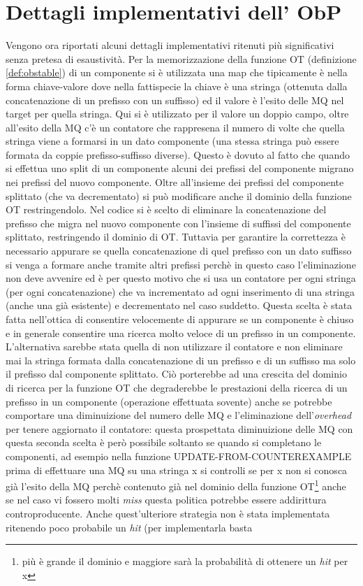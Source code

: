 \section[Dett. impl. ObP]{Dettagli implementativi dell' ObP}
\label{sec:implobp} 
Vengono ora riportati alcuni dettagli implementativi ritenuti più significativi senza pretesa di esaustività.
Per la memorizzazione della funzione OT (definizione \ref{def:obstable}) di un componente si è utilizzata una map che tipicamente è nella forma chiave-valore dove nella fattispecie la chiave è una stringa (ottenuta dalla concatenazione di un prefisso con un suffisso) ed il valore è l'esito delle \ac{MQ} nel target per quella stringa. Qui si è utilizzato per il valore un doppio campo, oltre all'esito della \ac{MQ} c'è un contatore che rappresena il numero di volte che quella stringa viene a formarsi in un dato componente (una stessa stringa può essere formata da  coppie prefisso-suffisso diverse). Questo è dovuto al fatto che quando si effettua uno split di un componente alcuni dei prefissi del componente migrano nei prefissi del nuovo componente. Oltre all'insieme dei prefissi del componente splittato (che va decrementato) si può modificare anche il dominio della funzione OT restringendolo. Nel codice si è scelto di eliminare la concatenazione del prefisso che migra nel nuovo componente con l'insieme di suffissi del componente splittato, restringendo il dominio di OT. Tuttavia per garantire la correttezza è necessario appurare se quella concatenazione di quel prefisso con un dato suffisso si venga a formare anche tramite altri prefissi perchè in questo caso l'eliminazione non deve avvenire ed è per questo motivo che si usa un contatore per ogni stringa (per ogni concatenazione) che va incrementato ad ogni inserimento di una stringa (anche una già esistente) e decrementato nel caso suddetto.  Questa scelta è stata fatta nell'ottica di consentire velocemente di appurare se un componente è chiuso e in generale consentire una ricerca molto veloce di un prefisso in un componente. L'alternativa sarebbe stata quella di non utilizzare il contatore e non eliminare mai la stringa formata dalla concatenazione di un prefisso e di un suffisso ma solo il prefisso dal componente splittato. Ciò porterebbe ad una crescita del dominio di ricerca per la funzione OT che degraderebbe le prestazioni della ricerca di un prefisso in un componente (operazione effettuata sovente) anche se potrebbe  comportare una diminuizione del numero delle \ac{MQ} e l'eliminazione dell'\textit{overhead} per tenere aggiornato il contatore: questa prospettata diminuizione delle \ac{MQ} con questa seconda scelta è però possibile soltanto se quando si completano le componenti, ad esempio nella funzione UPDATE-FROM-COUNTEREXAMPLE  prima di effettuare una \ac{MQ} su una stringa x si controlli se per x non si conosca già l'esito della \ac{MQ} perchè contenuto già nel dominio della funzione OT\footnote{più è grande il dominio e maggiore sarà la probabilità di ottenere un \textit{hit} per x} anche se nel caso vi fossero molti \textit{miss} questa politica potrebbe essere addirittura controproducente. Anche quest'ulteriore strategia non è stata implementata ritenendo poco probabile un \textit{hit} (per implementarla basta 